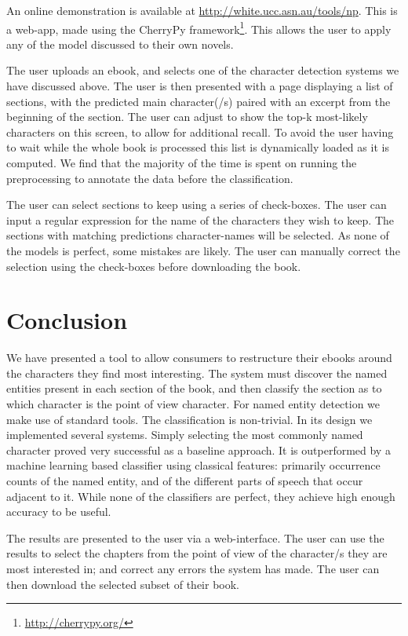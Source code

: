 \documentclass[11pt,a4paper]{article}
\begin{document}
An online demonstration is available at \url{http://white.ucc.asn.au/tools/np}.
This is a web-app, made using the CherryPy framework\footnote{\url{http://cherrypy.org/}}.
This allows the user to apply any of the model discussed to their own novels.


The user uploads an ebook, and selects one of the character detection systems we have discussed above.
The user is then presented with a page displaying a list of sections,
with the predicted main character(/s) paired with an excerpt from the beginning of the section.
The user can adjust to show the top-k most-likely characters on this screen, to allow for additional recall.
To avoid the user having to wait while the whole book is processed this list is dynamically loaded as it is computed.
We find that the majority of the time is spent on running the preprocessing to annotate the data before the classification.

The user can select sections to keep using a series of check-boxes.
The user can input a regular expression for the name of the characters they wish to keep.
The sections with matching predictions character-names will be selected.
As none of the models is perfect, some mistakes are likely.
The user can manually correct the selection using the check-boxes before downloading the book.



\section{Conclusion}\label{sec:conclusion}
We have presented a tool to allow consumers to restructure their ebooks around the characters they find most interesting.
The system must discover the named entities present in each section of the book,
and then classify the section as to which character is the point of view character.
For named entity detection we make use of standard tools.
The classification is non-trivial.
In its design we implemented several systems.
Simply selecting the most commonly named character proved very successful as a baseline approach.
It is outperformed by a machine learning based classifier using classical features: primarily occurrence counts of the named entity, and of the different parts of speech that occur adjacent to it.
While none of the classifiers are perfect,
they achieve high enough accuracy to be useful.

The results are presented to the user via a web-interface.
The user can use the results to select the chapters from the point of view of the character/s they are most interested in;
and correct any errors the system has made.
The user can then download the selected subset of their book.
\end{document}
